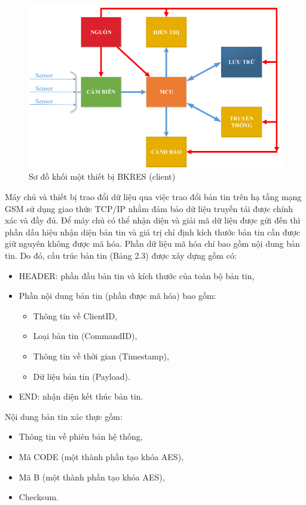 \begin{figure}[h]
    \begin{center}
     \includegraphics[scale=0.5]{image/hinh2_12}
    \end{center}
    \caption{Sơ đồ khối một thiết bị BKRES (client)}
    \label{refhinh2_12}
    \end{figure}
\par 
Máy chủ và thiết bị trao đổi dữ liệu qua việc trao đổi bản tin trên hạ tầng mạng GSM sử dụng giao thức TCP/IP nhằm đảm bảo dữ liệu truyền tải được chính xác và đầy đủ. Để máy chủ có thể nhận diện và giải mã dữ liệu được gửi đến thì phần dấu hiệu nhận diện bản tin và giá trị chỉ định kích thước bản tin cần được giữ nguyên không được mã hóa. Phần dữ liệu mã hóa chỉ bao gồm nội dung bản tin. Do đó, cấu trúc bản tin (Bảng 2.3) được xây dựng gồm có:
\begin{itemize}
\item HEADER: phần đầu bản tin và kích thước của toàn bộ bản tin,
\item Phần nội dung bản tin (phần được mã hóa) bao gồm:
  	\begin{itemize}
  	\item	Thông tin về ClientID,
  	\item	Loại bản tin (CommandID),
  	\item	Thông tin về thời gian (Timestamp),
  	\item 	Dữ liệu bản tin (Payload).
	\end{itemize}   
\item END: nhận diện kết thúc bản tin.
\end{itemize}
Nội dung bản tin xác thực gồm:
\begin{itemize}
\item Thông tin về phiên bản hệ thống,
\item Mã CODE (một thành phần tạo khóa AES),
\item Mã B (một thành phần tạo khóa AES),
\item Checksum.
\end{itemize}
